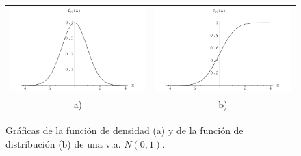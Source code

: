 \documentclass[12pt]{report}
\begin{document}
\begin{figure}[h]
\begin{center}
\begin{tabular}{cc}
 \includegraphics[scale=0.75]{densidadgaussiana}
&
\includegraphics[scale=0.75]{distribuciongaussiana}\\ a) & b) \end{tabular}
\end{center}
       \caption{Gráficas de la función de densidad (a)  y de la  función de distribución (b) de una v.a. $N(0,1)$.}
        \end{figure}


\end{document}
